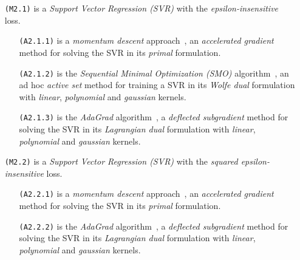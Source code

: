 \bigskip

\begin{itemize}
\item[\texttt{(M2.1)}] is a \emph{Support Vector Regression (SVR)} with the \emph{epsilon-insensitive} loss.

\begin{itemize}
\item[\texttt{(A2.1.1)}] is a \emph{momentum descent} approach~\cite{polyak1964some, nesterov1998introductory, nesterov1983method}, an \emph{accelerated gradient} method for solving the SVR in its \emph{primal} formulation.

\item[\texttt{(A2.1.2)}] is the \emph{Sequential Minimal Optimization (SMO)} algorithm~\cite{flake2002efficient, shevade1999improvements}, an ad hoc \emph{active set} method for training a SVR in its \emph{Wolfe dual} formulation with \emph{linear}, \emph{polynomial} and \emph{gaussian} kernels.

\item[\texttt{(A2.1.3)}] is the \emph{AdaGrad} algorithm~\cite{duchi2011adaptive}, a \emph{deflected subgradient} method for solving the SVR in its \emph{Lagrangian dual} formulation with \emph{linear}, \emph{polynomial} and \emph{gaussian} kernels.
\end{itemize}

\end{itemize}

\begin{itemize}
\item[\texttt{(M2.2)}] is a \emph{Support Vector Regression (SVR)} with the \emph{squared epsilon-insensitive} loss.

\begin{itemize}
\item[\texttt{(A2.2.1)}] is a \emph{momentum descent} approach~\cite{polyak1964some, nesterov1998introductory, nesterov1983method}, an \emph{accelerated gradient} method for solving the SVR in its \emph{primal} formulation.

\item[\texttt{(A2.2.2)}] is the \emph{AdaGrad} algorithm~\cite{duchi2011adaptive}, a \emph{deflected subgradient} method for solving the SVR in its \emph{Lagrangian dual} formulation with \emph{linear}, \emph{polynomial} and \emph{gaussian} kernels.
\end{itemize}

\end{itemize}